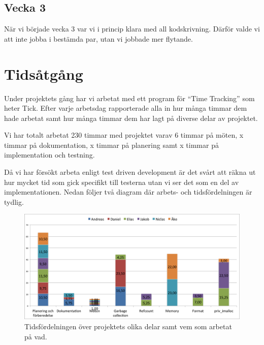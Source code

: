 \documentclass{article}
\begin{document}
\subsection{Vecka 3}
När vi började vecka 3 var vi i princip klara med all kodskrivning. Därför valde vi att inte jobba i bestämda par, utan vi jobbade mer flytande.


\section{Tidsåtgång}

Under projektets gång har vi arbetat med ett program för “Time Tracking” som heter Tick. Efter varje arbetsdag rapporterade alla in hur många timmar dem hade arbetat samt hur många timmar dem har lagt på diverse delar av projektet.

Vi har totalt arbetat 230 timmar med projektet varav 6 timmar på möten, x timmar på dokumentation, x timmar på planering samt x timmar på implementation och testning.

Då vi har försökt arbeta enligt test driven development är det svårt att räkna ut hur mycket tid som gick specifikt till testerna utan vi ser det som en del av implementationen. Nedan följer två diagram där arbets- och tidsfördelningen är tydlig.

\begin{figure}[H]
  \includegraphics[width=\columnwidth]{../bilder/chart_parts.png}
  \caption{Tidsfördelningen över projektets olika delar 
    samt vem som arbetat på vad.}
  \label{fig:chart_parts}
\end{figure}
\end{document}
